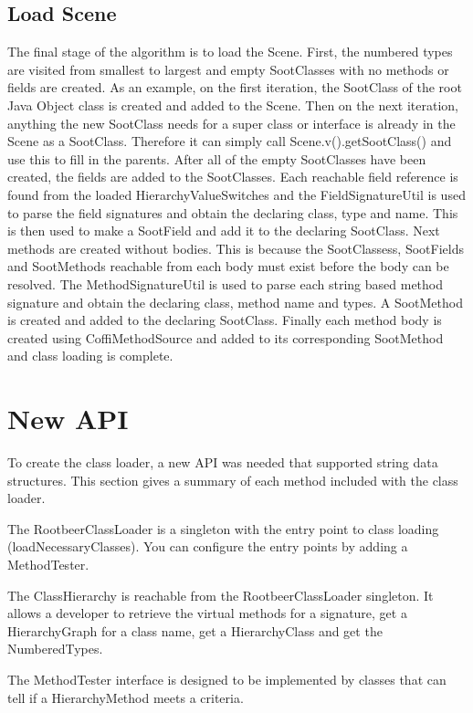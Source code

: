 \documentclass[preprint]{sigplanconf}
\begin{document}
\subsection{Load Scene}
\label{sec:loadscene}
The final stage of the algorithm is to load the Scene. First, the numbered types are visited from smallest to largest and empty SootClasses with no methods or fields are created. As an example, on the first iteration, the SootClass of the root Java Object class is created and added to the Scene. Then on the next iteration, anything the new SootClass needs for a super class or interface is already in the Scene as a SootClass. Therefore it can simply call Scene.v().getSootClass() and use this to fill in the parents.
After all of the empty SootClasses have been created, the fields are added to the SootClasses. Each reachable field reference is found from the loaded HierarchyValueSwitches and the FieldSignatureUtil is used to parse the field signatures and obtain the declaring class, type and name. This is then used to make a SootField and add it to the declaring SootClass. 
Next methods are created without bodies. This is because the SootClassess, SootFields and SootMethods reachable from each body must exist before the body can be resolved. The MethodSignatureUtil is used to parse each string based method signature and obtain the declaring class, method name and types. A SootMethod is created and added to the declaring SootClass.
Finally each method body is created using CoffiMethodSource and added to its corresponding SootMethod and class loading is complete.

\section{New API}
\label{sec:api}
To create the \rb class loader, a new API was needed that supported string data structures. This section gives a summary of each method included with the \rb class loader.

The RootbeerClassLoader is a singleton with the entry point to class loading (loadNecessaryClasses). You can configure the entry points by adding a MethodTester.


The ClassHierarchy is reachable from the RootbeerClassLoader singleton. It allows a developer to retrieve the virtual methods for a signature, get a HierarchyGraph for a class name, get a HierarchyClass and get the NumberedTypes.

The MethodTester interface is designed to be implemented by classes that can tell if a HierarchyMethod meets a criteria.
\end{document}
